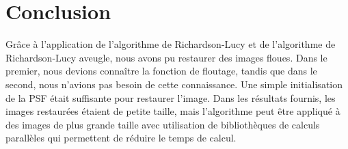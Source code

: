 \section{Conclusion}

Grâce à l'application de l'algorithme de Richardson-Lucy et de l'algorithme de Richardson-Lucy aveugle, nous avons pu restaurer des images floues. 
Dans le premier, nous devions connaître la fonction de floutage, tandis que dans le second, nous n'avions pas besoin de cette connaissance. 
Une simple initialisation de la PSF était suffisante pour restaurer l'image. 
Dans les résultats fournis, les images restaurées étaient de petite taille, mais l'algorithme peut être appliqué à des images de plus grande taille
avec utilisation de bibliothèques de calculs parallèles qui permettent de réduire le temps de calcul.
